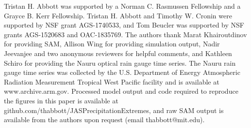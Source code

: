 \documentclass[twocol]{ametsoc}
\begin{document}
%

\acknowledgments
Tristan H. Abbott was supported by a Norman C. Rasmussen Fellowship and a Grayce B. Kerr Fellowship. Tristan H. Abbott and Timothy W. Cronin were supported by NSF grant AGS-1740533, and Tom Beucler was supported by NSF grants AGS-1520683 and OAC-1835769. The authors thank Marat Khairoutdinov for providing SAM, Allison Wing for providing simulation output, Nadir Jeevanjee and two anonymous reviewers for helpful comments, and Kathleen Schiro for providing the Nauru optical rain gauge time series. The Nauru rain gauge time series was collected by the U.S. Department of Energy Atmospheric Radiation Measurement Tropical West Pacific facility and is available at www.archive.arm.gov. Processed model output and code required to reproduce the figures in this paper is available at github.com/thabbott/JASPrecipitationExtremes, and raw SAM output is available from the authors upon request (email thabbott@mit.edu).

\clearpage

%





\end{document}
